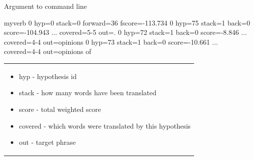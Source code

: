 \documentclass[landscape]{uedslides2C}
\begin{document}
\begin{center}
Argument to command line\\[2mm]
{\small \begin{SaveVerbatim}{myverb}
0 hyp=0 stack=0 forward=36 fscore=-113.734
0 hyp=75 stack=1 back=0 score=-104.943 ... covered=5-5 out=.
0 hyp=72 stack=1 back=0 score=-8.846 ... covered=4-4 out=opinions
0 hyp=73 stack=1 back=0 score=-10.661 ... covered=4-4 out=opinions of
\end{SaveVerbatim}
\colorbox{gray}{}

\vspace{-10mm}
\begin{tabular}{p{15cm}}
\begin{itemize} \itemsep -2mm
\item hyp - hypothesis id
\item  stack - how many words have been translated
\item score - total weighted score
\item covered - which words were translated by this hypothesis
\item out - target phrase
\end{itemize}
\end{tabular}}
\end{center}

\end{document}
